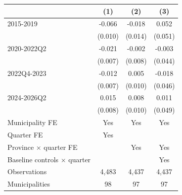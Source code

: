 \begin{tabular}{lccc}
\toprule
 & (1) & (2) & (3) \\
\midrule
2015-2019 & -0.066\sym{***} & -0.018 & 0.052 \\
 & (0.010) & (0.014) & (0.051) \\
2020-2022Q2 & -0.021\sym{***} & -0.002 & -0.003 \\
 & (0.007) & (0.008) & (0.044) \\
2022Q4-2023 & -0.012 & 0.005 & -0.018 \\
 & (0.007) & (0.010) & (0.046) \\
2024-2026Q2 & 0.015\sym{**} & 0.008 & 0.011 \\
 & (0.008) & (0.010) & (0.049) \\
\midrule
Municipality FE & Yes & Yes & Yes \\
Quarter FE & Yes & & \\
Province $\times$ quarter FE & & Yes & Yes \\
Baseline controls $\times$ quarter & & & Yes \\
Observations &  4,483 &  4,437 &  4,437 \\
Municipalities &     98 &     97 &     97 \\
\bottomrule
\end{tabular}
